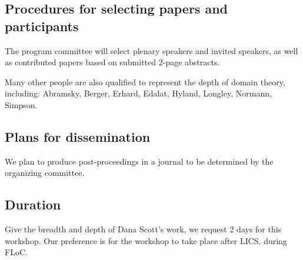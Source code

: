 \documentclass{article}
\begin{document}
\subsection{Procedures for selecting papers and participants}

The program committee will select plenary speakers and invited speakers, as well as contributed papers based on submitted 2-page abstracts. 


Many other people are also qualified to represent the depth of domain theory, including: Abramsky, Berger, Erhard, Edalat, Hyland, Longley, Normann, Simpson. 

\subsection{Plans for dissemination}

We plan to produce post-proceedings in a journal to be determined by the organizing committee.

\subsection{Duration}

Give the breadth and depth of Dana Scott's work, we request 2 days for
this workshop.  Our preference is for the workshop to take place after
LICS.  during FLoC.
\end{document}
